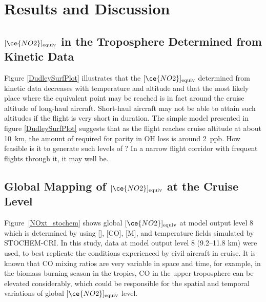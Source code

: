 \section{Results and Discussion}

\subsection{\texorpdfstring{${[\ce{NO2}]_{\mathrm{equiv}}}$ in the Troposphere Determined from Kinetic Data}{[NO2]equiv in the Troposphere Determined from Kinetic Data}}
Figure \ref{DudleySurfPlot} illustrates that the ${[\ce{NO2}]_{\mathrm{equiv}}}$ determined from kinetic data decreases with temperature and altitude and that the most likely place where the equivalent point may be reached is in fact around the cruise altitude of long-haul aircraft. Short-haul aircraft may not be able to attain such altitudes if the flight is very short in duration. The simple model presented in figure \ref{DudleySurfPlot} suggests that as the flight reaches cruise altitude at about 10~km, the amount of  required for parity in OH loss is around 2~ppb. How feasible is it to generate such levels of ? In a narrow flight corridor with frequent flights through it, it may well be.


\subsection{\texorpdfstring{Global Mapping of ${[\ce{NO2}]_{\mathrm{equiv}}}$ at the Cruise Level}{Global Mapping of [NO2]equiv at the Cruise Level}}
Figure~\ref{NOxt_stochem} shows global ${[\ce{NO2}]_{\mathrm{equiv}}}$ at model output level 8 which is determined by using [], [CO], [M], and temperature fields simulated by STOCHEM-CRI. In this study, data at model output level 8 (9.2--11.8 km) were used, to best replicate the conditions experienced by civil aircraft in cruise. It is known that CO mixing ratios are very variable in space and time, for example, in the biomass burning season in the tropics, CO in the upper troposphere can be elevated considerably, which could be responsible for the spatial and temporal variations of global ${[\ce{NO2}]_{\mathrm{equiv}}}$ level. 

